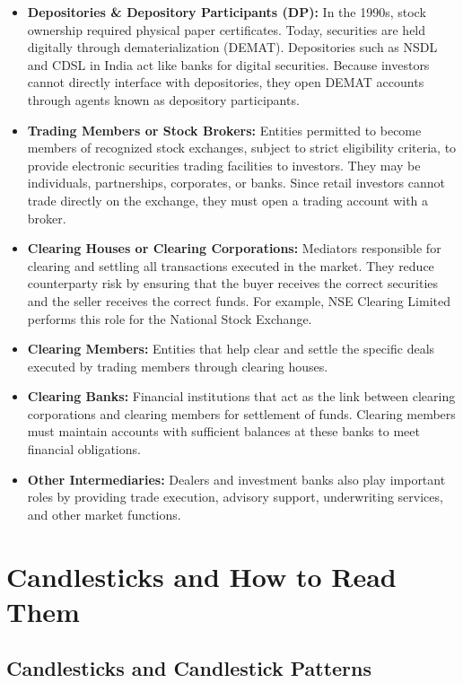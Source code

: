 \documentclass[12pt,openany]{book}
\begin{document}
\begin{itemize}[leftmargin=*]
    \item \textbf{Depositories \& Depository Participants (DP):} In the 1990s, stock ownership required physical paper certificates. Today, securities are held digitally through dematerialization (DEMAT). Depositories such as NSDL and CDSL in India act like banks for digital securities. Because investors cannot directly interface with depositories, they open DEMAT accounts through agents known as depository participants.
    \item \textbf{Trading Members or Stock Brokers:} Entities permitted to become members of recognized stock exchanges, subject to strict eligibility criteria, to provide electronic securities trading facilities to investors. They may be individuals, partnerships, corporates, or banks. Since retail investors cannot trade directly on the exchange, they must open a trading account with a broker.
    \item \textbf{Clearing Houses or Clearing Corporations:} Mediators responsible for clearing and settling all transactions executed in the market. They reduce counterparty risk by ensuring that the buyer receives the correct securities and the seller receives the correct funds. For example, NSE Clearing Limited performs this role for the National Stock Exchange.
    \item \textbf{Clearing Members:} Entities that help clear and settle the specific deals executed by trading members through clearing houses.
    \item \textbf{Clearing Banks:} Financial institutions that act as the link between clearing corporations and clearing members for settlement of funds. Clearing members must maintain accounts with sufficient balances at these banks to meet financial obligations.
    \item \textbf{Other Intermediaries:} Dealers and investment banks also play important roles by providing trade execution, advisory support, underwriting services, and other market functions.
\end{itemize}


\section{Candlesticks and How to Read Them}

\subsection{Candlesticks and Candlestick Patterns}
\end{document}
